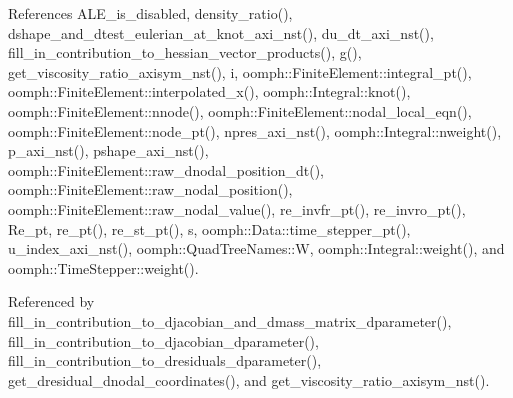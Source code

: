 References A\+L\+E\+\_\+is\+\_\+disabled, density\+\_\+ratio(), dshape\+\_\+and\+\_\+dtest\+\_\+eulerian\+\_\+at\+\_\+knot\+\_\+axi\+\_\+nst(), du\+\_\+dt\+\_\+axi\+\_\+nst(), fill\+\_\+in\+\_\+contribution\+\_\+to\+\_\+hessian\+\_\+vector\+\_\+products(), g(), get\+\_\+viscosity\+\_\+ratio\+\_\+axisym\+\_\+nst(), i, oomph\+::\+Finite\+Element\+::integral\+\_\+pt(), oomph\+::\+Finite\+Element\+::interpolated\+\_\+x(), oomph\+::\+Integral\+::knot(), oomph\+::\+Finite\+Element\+::nnode(), oomph\+::\+Finite\+Element\+::nodal\+\_\+local\+\_\+eqn(), oomph\+::\+Finite\+Element\+::node\+\_\+pt(), npres\+\_\+axi\+\_\+nst(), oomph\+::\+Integral\+::nweight(), p\+\_\+axi\+\_\+nst(), pshape\+\_\+axi\+\_\+nst(), oomph\+::\+Finite\+Element\+::raw\+\_\+dnodal\+\_\+position\+\_\+dt(), oomph\+::\+Finite\+Element\+::raw\+\_\+nodal\+\_\+position(), oomph\+::\+Finite\+Element\+::raw\+\_\+nodal\+\_\+value(), re\+\_\+invfr\+\_\+pt(), re\+\_\+invro\+\_\+pt(), Re\+\_\+pt, re\+\_\+pt(), re\+\_\+st\+\_\+pt(), s, oomph\+::\+Data\+::time\+\_\+stepper\+\_\+pt(), u\+\_\+index\+\_\+axi\+\_\+nst(), oomph\+::\+Quad\+Tree\+Names\+::W, oomph\+::\+Integral\+::weight(), and oomph\+::\+Time\+Stepper\+::weight().



Referenced by fill\+\_\+in\+\_\+contribution\+\_\+to\+\_\+djacobian\+\_\+and\+\_\+dmass\+\_\+matrix\+\_\+dparameter(), fill\+\_\+in\+\_\+contribution\+\_\+to\+\_\+djacobian\+\_\+dparameter(), fill\+\_\+in\+\_\+contribution\+\_\+to\+\_\+dresiduals\+\_\+dparameter(), get\+\_\+dresidual\+\_\+dnodal\+\_\+coordinates(), and get\+\_\+viscosity\+\_\+ratio\+\_\+axisym\+\_\+nst().

\mbox{\label{classoomph_1_1GeneralisedNewtonianAxisymmetricNavierStokesEquations_ad41c00dfe90c6dbc9e53fac71f20489e}} 
